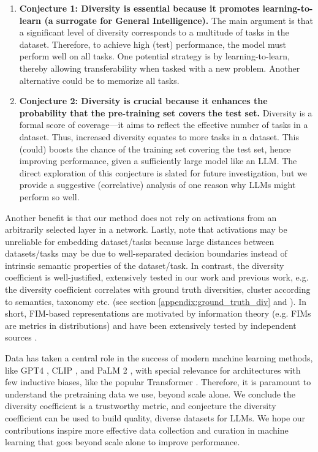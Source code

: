 \begin{enumerate}
    \item \textbf{Conjecture 1: Diversity is essential because it promotes learning-to-learn (a surrogate for General Intelligence).} 
    The main argument is that a significant level of diversity corresponds to a multitude of tasks in the dataset.
    Therefore, to achieve high (test) performance, the model must perform well on all tasks.
    One potential strategy is by learning-to-learn, thereby allowing transferability when tasked with a new problem. 
    Another alternative could be to memorize all tasks. 
    \item \textbf{Conjecture 2: Diversity is crucial because it enhances the probability that the pre-training set covers the test set.}
    Diversity is a formal score of coverage---it aims to reflect the effective number of tasks in a dataset.
    Thus, increased diversity equates to more tasks in a dataset.
    This (could) boosts the chance of the training set covering the test set, hence improving performance, given a sufficiently large model like an LLM.
    The direct exploration of this conjecture is slated for future investigation, but we provide a suggestive (correlative) analysis of one reason why LLMs might perform so well. 
\end{enumerate}

Another benefit is that our method does not rely on activations from an arbitrarily selected layer in a network.
Lastly, note that activations may be unreliable for embedding dataset/tasks because large distances between datasets/tasks may be due to well-separated decision boundaries instead of intrinsic semantic properties of the dataset/task.
In contrast, the diversity coefficient is well-justified, extensively tested in our work and previous work, e.g. the diversity coefficient correlates with ground truth diversities, cluster according to semantics, taxonomy etc. (see section \ref{appendix:ground_truth_div} and \cite{task2vec, curse_low_div}). 
In short, FIM-based representations are motivated by information theory (e.g. FIMs are metrics in distributions) and have been extensively tested by independent sources \citep{curse_low_div, task2vec, nlp_task2vec}.

Data has taken a central role in the success of modern machine learning methods, like GPT4 \cite{gpt4}, CLIP \cite{clip}, and PaLM 2 \cite{google2023palm2}, with special relevance for architectures with few inductive biases, like the popular Transformer \citep{vaswani2017attention}.
Therefore, it is paramount to understand the pretraining data we use, beyond scale alone.
We conclude the diversity coefficient is a trustworthy metric, and conjecture the diversity coefficient can be used to build quality, diverse datasets for LLMs.
We hope our contributions inspire more effective data collection and curation in machine learning that goes beyond scale alone to improve performance. 


